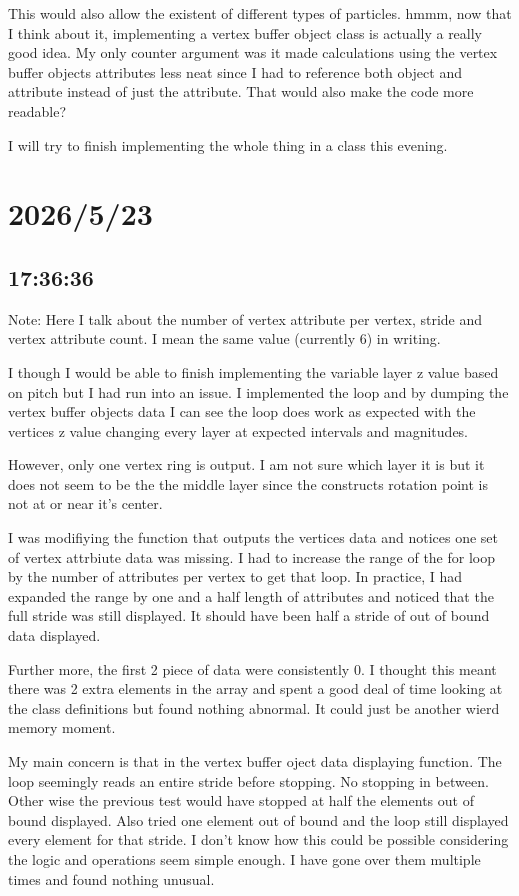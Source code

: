 \documentclass{article}
\begin{document}
This would also allow the existent of different types of particles. hmmm, now that I think about it, 
implementing a vertex buffer object class is actually a really good idea. My only counter argument was
it made calculations using the vertex buffer objects attributes less neat since I had to reference both
object and attribute instead of just the attribute. That would also make the code more readable? 

I will try to finish implementing the whole thing in a class this evening.
\section*{2026/5/23}
\subsection*{17:36:36}
Note: Here I talk about the number of vertex attribute per vertex, stride and vertex attribute count.
I mean the same value (currently 6) in writing.

I though I would be able to finish implementing the variable layer z value based on pitch but I had run
into an issue. I implemented the loop and by dumping the vertex buffer objects data I can see the loop
does work as expected with the vertices z value changing every layer at expected intervals and magnitudes.

However, only one vertex ring is output. I am not sure which layer it is but it does not seem to be the 
the middle layer since the constructs rotation point is not at or near it's center.

I was modifiying the function that outputs the vertices data and notices one set of vertex attrbiute data 
was missing. I had to increase the range of the for loop by the number of attributes per vertex to get that
loop. In practice, I had expanded the range by one and a half length of attributes and noticed that the full
stride was still displayed. It should have been half a stride of out of bound data displayed.

Further more, the first 2 piece of data were consistently 0. I thought this meant there was 2 extra elements
in the array and spent a good deal of time looking at the class definitions but found nothing abnormal. It
could just be another wierd memory moment.

My main concern is that in the vertex buffer oject data displaying function. The loop seemingly reads an entire
stride before stopping. No stopping in between. Other wise the previous test would have stopped at half the 
elements out of bound displayed. Also tried one element out of bound and the loop still displayed every element
for that stride. I don't know how this could be possible considering the logic and operations seem simple enough.
I have gone over them multiple times and found nothing unusual.
\end{document}
